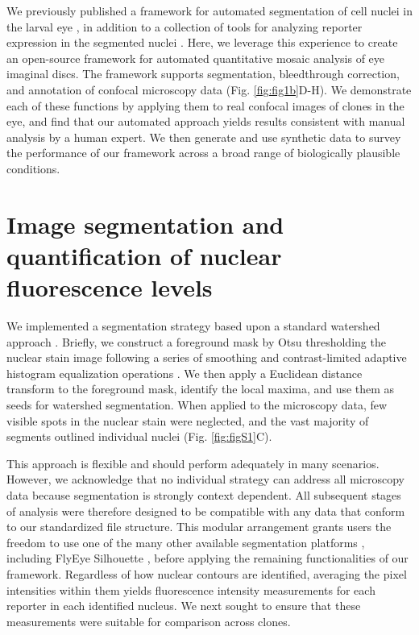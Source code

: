 We previously published a framework for automated segmentation of cell nuclei in the larval eye \cite{Pelaez2015a}, in addition to a collection of tools for analyzing reporter expression in the segmented nuclei \cite{Bernasek2018}. Here, we leverage this experience to create an open-source framework for automated quantitative mosaic analysis of eye imaginal discs. The framework supports segmentation, bleedthrough correction, and annotation of confocal microscopy data (Fig. \ref{fig:fig1b}D-H). We demonstrate each of these functions by applying them to real confocal images of clones in the eye, and find that our automated approach yields results consistent with manual analysis by a human expert. We then generate and use synthetic data to survey the performance of our framework across a broad range of biologically plausible conditions.



\section{Image segmentation and quantification of nuclear fluorescence levels}
\label{ch:segmentation}

We implemented a segmentation strategy based upon a standard watershed approach \cite{VanderWalt2014}. Briefly, we construct a foreground mask by Otsu thresholding the nuclear stain image following a series of smoothing and contrast-limited adaptive histogram equalization operations \cite{NobuyukiOtsu1979,VanderWalt2014}. We then apply a Euclidean distance transform to the foreground mask, identify the local maxima, and use them as seeds for watershed segmentation. When applied to the microscopy data, few visible spots in the nuclear stain were neglected, and the vast majority of segments outlined individual nuclei (Fig. \ref{fig:figS1}C).

This approach is flexible and should perform adequately in many scenarios. However, we acknowledge that no individual strategy can address all microscopy data because segmentation is strongly context dependent. All subsequent stages of analysis were therefore designed to be compatible with any data that conform to our standardized file structure. This modular arrangement grants users the freedom to use one of the many other available segmentation platforms \cite{Bugarski2014}, including FlyEye Silhouette \cite{Pelaez2015a}, before applying the remaining functionalities of our framework. Regardless of how nuclear contours are identified, averaging the pixel intensities within them yields fluorescence intensity measurements for each reporter in each identified nucleus. We next sought to ensure that these measurements were suitable for comparison across clones.


